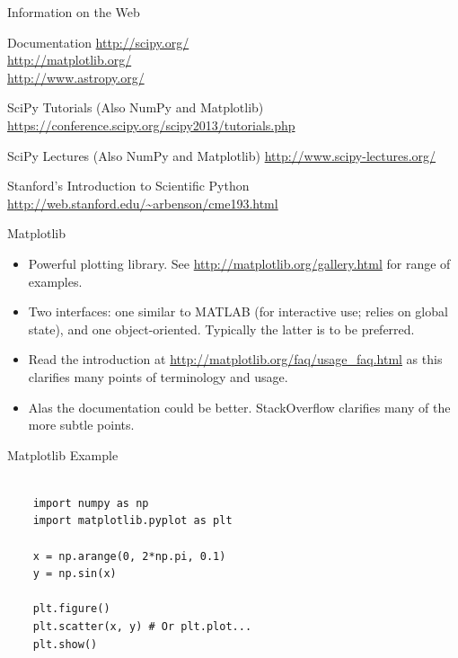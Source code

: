 \documentclass{beamer}
\begin{document}
\begin{frame}{Information on the Web}
  \begin{block}{Documentation}
    \url{http://scipy.org/} \\
    \url{http://matplotlib.org/} \\
    \url{http://www.astropy.org/}
  \end{block}

  \begin{block}{SciPy Tutorials (Also NumPy and Matplotlib)}
    \url{https://conference.scipy.org/scipy2013/tutorials.php}
  \end{block}
  
  \begin{block}{SciPy Lectures (Also NumPy and Matplotlib)}
    \url{http://www.scipy-lectures.org/}
  \end{block}
  
  \begin{block}{Stanford's Introduction to Scientific Python}
    \url{http://web.stanford.edu/~arbenson/cme193.html}
  \end{block}
  
\end{frame}

\begin{frame}{Matplotlib}
  \begin{itemize}
    \item Powerful plotting library. See \url{http://matplotlib.org/gallery.html} for range of examples.
    \item Two interfaces: one similar to MATLAB (for interactive use; relies on global state), and one object-oriented. Typically the latter is to be preferred.
    \item Read the introduction at \url{http://matplotlib.org/faq/usage_faq.html} as this clarifies many points of terminology and usage.
    \item Alas the documentation could be better. StackOverflow clarifies many of the more subtle points.
  \end{itemize} 
\end{frame}



\begin{frame}[fragile]{Matplotlib Example}
  \begin{lstlisting}

    import numpy as np
    import matplotlib.pyplot as plt
  
    x = np.arange(0, 2*np.pi, 0.1)
    y = np.sin(x)
  
    plt.figure()
    plt.scatter(x, y) # Or plt.plot...
    plt.show()
  
  \end{lstlisting}
\end{frame}
\end{document}
